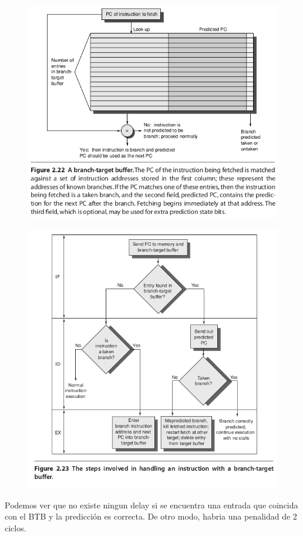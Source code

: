 \documentclass{article}
\begin{document}
\begin{figure}[h!]
    \includegraphics[width=\linewidth]{imagenes/pipeline/btb.png}
\end{figure}
\newpage
\begin{figure}[h!]
    \includegraphics[width=\linewidth]{imagenes/pipeline/btb-steps.png}
\end{figure}
Podemos ver que no existe ningun delay si se encuentra una entrada que coincida con el BTB y la predicción es correcta. De otro modo, habria una penalidad de 2 ciclos.
\end{document}
